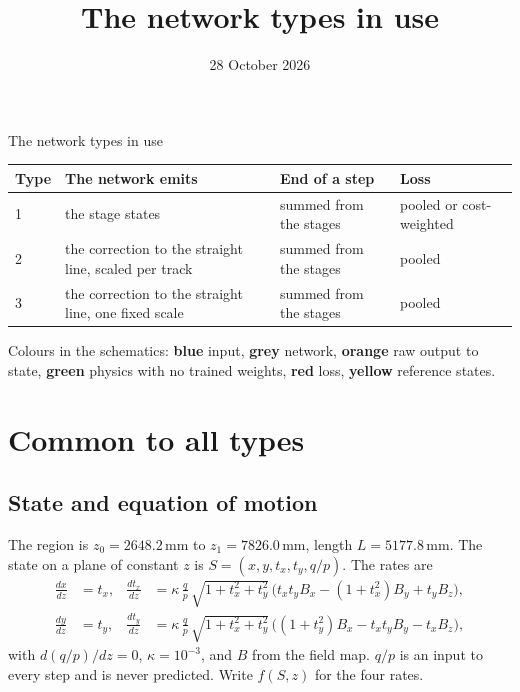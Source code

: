 \documentclass[11pt,a4paper]{article}
\title{The network types in use}
\date{28 October 2026}
\author{}
\begin{document}
\begin{center}{\LARGE The network types in use}\end{center}
\vspace{2mm}

\begin{center}
\footnotesize
\begin{tabularx}{\textwidth}{@{}l X X l@{}}
\toprule
Type & The network emits & End of a step & Loss \\
\midrule
1 & the stage states & summed from the stages & pooled or cost-weighted \\
2 & the correction to the straight line, scaled per track & summed from the stages & pooled \\
3 & the correction to the straight line, one fixed scale & summed from the stages & pooled \\
\bottomrule
\end{tabularx}
\end{center}

Colours in the schematics:
\textcolor{inp}{\textbf{blue}} input,
\textcolor{net}{\textbf{grey}} network,
\textcolor{form}{\textbf{orange}} raw output to state,
\textcolor{phys}{\textbf{green}} physics with no trained weights,
\textcolor{loss}{\textbf{red}} loss,
\textcolor{tgt}{\textbf{yellow}} reference states.

\section{Common to all types}

\subsection*{State and equation of motion}

The region is $z_0 = 2648.2$\,mm to $z_1 = 7826.0$\,mm, length $L = 5177.8$\,mm. The state on a plane of constant $z$ is $S = (x, y, t_x, t_y, q/p)$. The rates are
\begin{align*}
\frac{dx}{dz} &= t_x, &
\frac{dt_x}{dz} &= \kappa\,\tfrac{q}{p}\,\sqrt{1+t_x^2+t_y^2}\,\bigl(t_x t_y B_x - (1+t_x^2) B_y + t_y B_z\bigr),\\
\frac{dy}{dz} &= t_y, &
\frac{dt_y}{dz} &= \kappa\,\tfrac{q}{p}\,\sqrt{1+t_x^2+t_y^2}\,\bigl((1+t_y^2) B_x - t_x t_y B_y - t_x B_z\bigr),
\end{align*}
with $d(q/p)/dz = 0$, $\kappa = 10^{-3}$, and $B$ from the field map. $q/p$ is an input to every step and is never predicted. Write $f(S, z)$ for the four rates.
\end{document}
